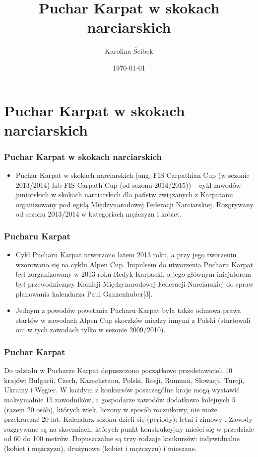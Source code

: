 \documentclass{beamer}
\title{Puchar Karpat w skokach narciarskich}
\author{Karolina Ścibek}
\date{\today}
\begin{document}
\section{Puchar Karpat w skokach narciarskich}

\maketitle
\begin{frame}
\frame
{
\frametitle{Puchar Karpat w skokach narciarskich}
}
\begin{itemize}
\item 
Puchar Karpat w skokach narciarskich (ang. FIS Carpathian Cup (w sezonie 2013/2014) lub FIS Carpath Cup (od sezonu 2014/2015)) – cykl zawodów juniorskich w skokach narciarskich dla państw związanych z Karpatami organizowany pod egidą Międzynarodowej Federacji Narciarskiej. Rozgrywany od sezonu 2013/2014 w kategoriach mężczyzn i kobiet.

\end{itemize}
\end{frame}
\begin{frame}
\frame
{
\frametitle{Pucharu Karpat}
}
\begin{itemize}
\item
Cykl Pucharu Karpat utworzono latem 2013 roku, a przy jego tworzeniu wzorowano się na cyklu Alpen Cup. Impulsem do utworzenia Pucharu Karpat był zorganizowany w 2013 roku Redyk Karpacki, a jego głównym inicjatorem był przewodniczący Komisji Międzynarodowej Federacji Narciarskiej do spraw planowania kalendarza Paul Ganzenhuber[3].
\item 
Jednym z powodów powstania Pucharu Karpat była także odmowa prawa startów w zawodach Alpen Cup skoczków między innymi z Polski (startowali oni w tych zawodach tylko w sezonie 2009/2010).
\end{itemize}
\end{frame}
\begin{frame}
\frame
{
\frametitle{Puchar Karpat}
}
Do udziału w Pucharze Karpat dopuszczono początkowo przedstawicieli 10 krajów: Bułgarii, Czech, Kazachstanu, Polski, Rosji, Rumunii, Słowacji, Turcji, Ukrainy i Węgier. W każdym z konkursów poszczególne kraje mogą wystawić maksymalnie 15 zawodników, a gospodarze zawodów dodatkowo kolejnych 5 (razem 20 osób), których wiek, liczony w sposób rocznikowy, nie może przekraczać 20 lat. Kalendarz  sezonu dzieli się  (periody): letni  i zimowy . Zawody rozgrywane są na skoczniach, których punkt konstrukcyjny mieści się w przedziale od 60 do 100 metrów. Dopuszczalne są trzy rodzaje konkursów: indywidualne (kobiet i mężczyzn), drużynowe (kobiet i mężczyzn) i mieszane.
\end{frame}
\end{document}
